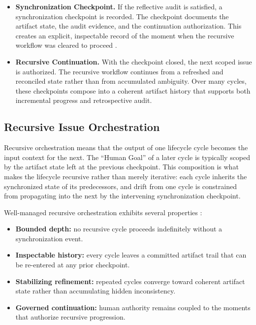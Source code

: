 \begin{itemize}
  \item \textbf{Synchronization Checkpoint.} If the reflective audit is satisfied, a synchronization checkpoint is recorded. The checkpoint documents the artifact state, the audit evidence, and the continuation authorization. This creates an explicit, inspectable record of the moment when the recursive workflow was cleared to proceed \cite{Chandy1985DistributedSnapshots}.

  \item \textbf{Recursive Continuation.} With the checkpoint closed, the next scoped issue is authorized. The recursive workflow continues from a refreshed and reconciled state rather than from accumulated ambiguity. Over many cycles, these checkpoints compose into a coherent artifact history that supports both incremental progress and retrospective audit.
\end{itemize}

\subsection{Recursive Issue Orchestration}

Recursive orchestration means that the output of one lifecycle cycle becomes the input context for the next. The ``Human Goal'' of a later cycle is typically scoped by the artifact state left at the previous checkpoint. This composition is what makes the lifecycle recursive rather than merely iterative: each cycle inherits the synchronized state of its predecessors, and drift from one cycle is constrained from propagating into the next by the intervening synchronization checkpoint.

Well-managed recursive orchestration exhibits several properties \cite{Wiener1948Cybernetics,Beer1972BrainFirm}:
\begin{itemize}
  \item \textbf{Bounded depth:} no recursive cycle proceeds indefinitely without a synchronization event.
  \item \textbf{Inspectable history:} every cycle leaves a committed artifact trail that can be re-entered at any prior checkpoint.
  \item \textbf{Stabilizing refinement:} repeated cycles converge toward coherent artifact state rather than accumulating hidden inconsistency.
  \item \textbf{Governed continuation:} human authority remains coupled to the moments that authorize recursive progression.
\end{itemize}

